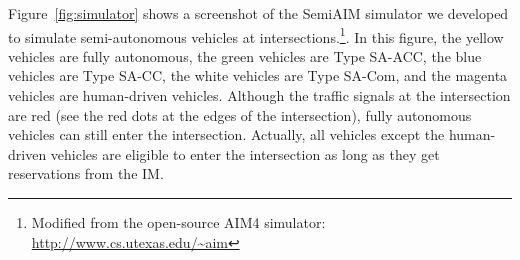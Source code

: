 Figure~\ref{fig:simulator} shows a screenshot of the SemiAIM simulator
we developed to simulate semi-autonomous vehicles at
intersections.\footnote{Modified from the open-source AIM4 simulator:
\url{http://www.cs.utexas.edu/~aim}}.  In this figure, the yellow
vehicles are fully autonomous, the green vehicles are Type SA-ACC, the
blue vehicles are Type SA-CC, the white vehicles are Type SA-Com, and
the magenta vehicles are human-driven vehicles.  Although the traffic
signals at the intersection are red (see the red dots at the edges of
the intersection), fully autonomous vehicles can still enter the
intersection. Actually, all vehicles except the human-driven vehicles
are eligible to enter the intersection as long as they get
reservations from the IM.












